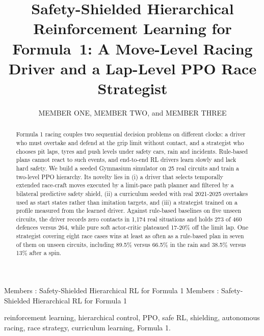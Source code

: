 \documentclass{ieeeaccess}
\begin{document}

\title{Safety-Shielded Hierarchical Reinforcement Learning for Formula~1: A Move-Level Racing Driver and a Lap-Level PPO Race Strategist}
\author{\uppercase{Member One}, \uppercase{Member Two}, and \uppercase{Member Three}}
\address[1]{Department, Institution, City, Country (e-mail: name@example.edu)}

\markboth
{Members \headeretal: Safety-Shielded Hierarchical RL for Formula 1}
{Members \headeretal: Safety-Shielded Hierarchical RL for Formula 1}


\begin{abstract}
Formula 1 racing couples two sequential decision problems on different clocks: a driver who must overtake and defend at the grip limit without contact, and a strategist who chooses pit laps, tyres and push levels under safety cars, rain and incidents. Rule-based plans cannot react to such events, and end-to-end RL drivers learn slowly and lack hard safety. We build a seeded Gymnasium simulator on 25 real circuits and train a two-level PPO hierarchy. Its novelty lies in (i) a driver that selects temporally extended race-craft moves executed by a limit-pace path planner and filtered by a bilateral predictive safety shield, (ii) a curriculum seeded with real 2021-2025 overtakes used as start states rather than imitation targets, and (iii) a strategist trained on a profile measured from the learned driver. Against rule-based baselines on five unseen circuits, the driver records zero contacts in 1,174 real situations and holds 273 of 460 defences versus 264, while pure soft actor-critic plateaued 17-20\% off the limit lap. One strategist covering eight race cases wins at least as often as a rule-based plan in seven of them on unseen circuits, including 89.5\% versus 66.5\% in the rain and 38.5\% versus 13\% after a spin.
\end{abstract}

\begin{keywords}
reinforcement learning, hierarchical control, PPO, safe RL, shielding, autonomous racing, race strategy, curriculum learning, Formula 1.
\end{keywords}
\end{document}
